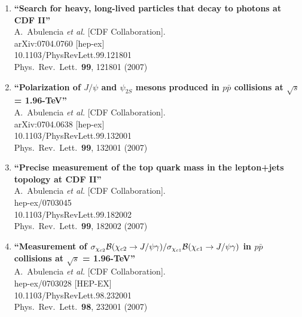 \documentclass{article}
\begin{document}
\begin{enumerate}
\item%
{\bf ``Search for heavy, long-lived particles that decay to photons at CDF II''}
  \\{}A.~Abulencia {\it et al.}  [CDF Collaboration].
  \\{}arXiv:0704.0760 [hep-ex]
    \\{}10.1103/PhysRevLett.99.121801
\\{}Phys.\ Rev.\ Lett.\  {\bf 99}, 121801 (2007) %


\item%
{\bf ``Polarization of $J/\psi$ and $\psi_{2S}$ mesons produced in $p \bar{p}$ collisions at $\sqrt{s}$ = 1.96-TeV''}
  \\{}A.~Abulencia {\it et al.}  [CDF Collaboration].
  \\{}arXiv:0704.0638 [hep-ex]
    \\{}10.1103/PhysRevLett.99.132001
\\{}Phys.\ Rev.\ Lett.\  {\bf 99}, 132001 (2007) %


\item%
{\bf ``Precise measurement of the top quark mass in the lepton+jets topology at CDF II''}
  \\{}A.~Abulencia {\it et al.}  [CDF Collaboration].
  \\{}hep-ex/0703045
    \\{}10.1103/PhysRevLett.99.182002
\\{}Phys.\ Rev.\ Lett.\  {\bf 99}, 182002 (2007) %


\item%
{\bf ``Measurement of $\sigma_{\chi_{c2}}{\cal B}(\chi_{c2} \to J/\psi \gamma)/\sigma_{\chi_{c1}} {\cal B}(\chi_{c1} \to J/\psi \gamma)$ in $p \bar{p}$ collisions at $\sqrt{s}$ = 1.96-TeV''}
  \\{}A.~Abulencia {\it et al.}  [CDF Collaboration].
  \\{}hep-ex/0703028 [HEP-EX]
    \\{}10.1103/PhysRevLett.98.232001
\\{}Phys.\ Rev.\ Lett.\  {\bf 98}, 232001 (2007) %



\end{enumerate}
\end{document}

